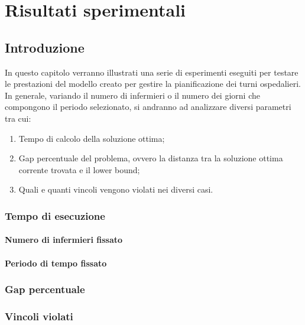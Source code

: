\chapter{Risultati sperimentali}\label{ch:chapter3}

\section{Introduzione}
In questo capitolo verranno illustrati una serie di esperimenti eseguiti per testare le prestazioni del modello creato per gestire la pianificazione dei turni ospedalieri.
In generale, variando il numero di infermieri o il numero dei giorni che compongono il periodo selezionato, si andranno ad analizzare diversi parametri tra cui:
\begin{enumerate}
\item Tempo di calcolo della soluzione ottima;
\item Gap percentuale del problema, ovvero la distanza tra la soluzione ottima corrente trovata e il lower bound;
\item Quali e quanti vincoli vengono violati nei diversi casi.
\end{enumerate}

\subsection{Tempo di esecuzione}

\subsubsection*{Numero di infermieri fissato}

\subsubsection*{Periodo di tempo fissato}

\subsection{Gap percentuale}


\subsection{Vincoli violati}
